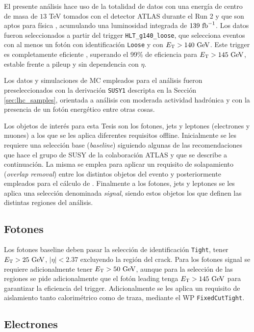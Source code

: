 El presente análisis hace uso de la totalidad de datos con una energía de centro de masa de $13$ TeV tomados con el detector ATLAS durante el Run 2 y que son aptos para física , acumulando una luminosidad integrada de $139\ \text{fb}^{-1}$. Los datos fueron seleccionados a partir del trigger \texttt{HLT\_g140\_loose}, que selecciona eventos con al menos un fotón con identificación \texttt{Loose} y con $E_{\text{T}}>140\ \text{GeV}$. Este trigger es completamente eficiente \cite{TRIG-2018-05}, superando el 99\% de eficiencia para $E_{\text{T}}>145\ \text{GeV}$, estable frente a pileup y sin dependencia con $\eta$.

Los datos y simulaciones de MC empleados para el análisis fueron preseleccionados con la derivación \texttt{SUSY1} descripta en la Sección \ref{sec:lhc_samples}, orientada a análisis con moderada actividad hadrónica y con la presencia de un fotón energético entre otras cosas.

Los objetos de interés para esta Tesis son los fotones, jets y leptones (electrones y muones) a los que se les aplica diferentes requisitos offline. Inicialmente se les requiere una selección base (\textit{baseline}) siguiendo algunas de las recomendaciones que hace el grupo de SUSY de la colaboración ATLAS y que se describe a continuación. La misma se emplea para aplicar un requisito de solapamiento (\textit{overlap removal}) entre los distintos objetos del evento y posteriormente empleados para el cálculo de \met. Finalmente a los fotones, jets y leptones se les aplica una selección denominada \textit{signal}, siendo estos objetos los que definen las distintas regiones del análisis.


\subsection{Fotones}

Los fotones baseline deben pasar la selección de identificación \texttt{Tight}, tener $\ET>25\ \gev$, $|\eta|<2.37$ excluyendo la región del crack. Para los fotones signal se requiere adicionalmente tener $E_{\text{T}}>50\ \text{GeV}$, aunque para la selección de las regiones se pide adicionalmente que el fotón leading tenga $E_{\text{T}}>145\ \text{GeV}$ para garantizar la eficiencia del trigger. Adicionalmente se les aplica un requisito de aislamiento tanto calorimétrico como de traza, mediante el WP \texttt{FixedCutTight}.


\subsection{Electrones}


